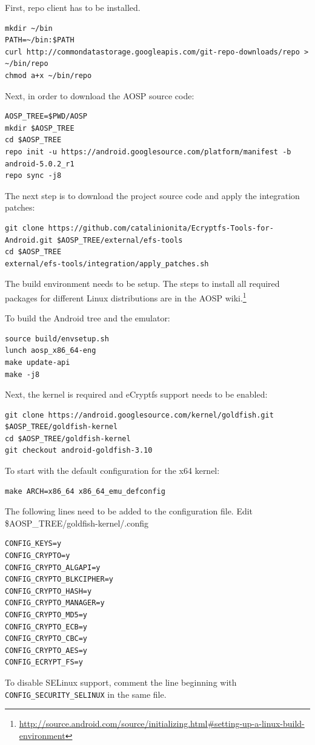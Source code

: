 First, repo client has to be installed.

\begin{lstlisting}[numbers=none]
mkdir ~/bin
PATH=~/bin:$PATH
curl http://commondatastorage.googleapis.com/git-repo-downloads/repo > ~/bin/repo
chmod a+x ~/bin/repo
\end{lstlisting}

Next, in order to download the AOSP source code:
\begin{lstlisting}[numbers=none]
AOSP_TREE=$PWD/AOSP
mkdir $AOSP_TREE
cd $AOSP_TREE
repo init -u https://android.googlesource.com/platform/manifest -b android-5.0.2_r1
repo sync -j8
\end{lstlisting}

The next step is to download the project source code and apply the integration patches:
\begin{lstlisting}[numbers=none]
git clone https://github.com/catalinionita/Ecryptfs-Tools-for-Android.git $AOSP_TREE/external/efs-tools
cd $AOSP_TREE
external/efs-tools/integration/apply_patches.sh
\end{lstlisting}

The build environment needs to be setup. The steps to install all required packages for different Linux distributions are in the AOSP wiki.\footnote{\url{http://source.android.com/source/initializing.html\#setting-up-a-linux-build-environment}}

To build the Android tree and the emulator:
\begin{lstlisting}[numbers=none]
source build/envsetup.sh
lunch aosp_x86_64-eng
make update-api
make -j8
\end{lstlisting}

Next, the kernel is required and eCryptfs support needs to be enabled:
\begin{lstlisting}[numbers=none]
git clone https://android.googlesource.com/kernel/goldfish.git $AOSP_TREE/goldfish-kernel
cd $AOSP_TREE/goldfish-kernel
git checkout android-goldfish-3.10
\end{lstlisting}

To start with the default configuration for the x64 kernel:
\begin{lstlisting}[numbers=none]
make ARCH=x86_64 x86_64_emu_defconfig
\end{lstlisting}

The following lines need to be added to the configuration file. Edit \$AOSP_TREE/goldfish-kernel/.config
\begin{lstlisting}[numbers=none]
CONFIG_KEYS=y
CONFIG_CRYPTO=y
CONFIG_CRYPTO_ALGAPI=y
CONFIG_CRYPTO_BLKCIPHER=y
CONFIG_CRYPTO_HASH=y
CONFIG_CRYPTO_MANAGER=y
CONFIG_CRYPTO_MD5=y
CONFIG_CRYPTO_ECB=y
CONFIG_CRYPTO_CBC=y
CONFIG_CRYPTO_AES=y
CONFIG_ECRYPT_FS=y
\end{lstlisting}
To disable SELinux support, comment the line beginning with \texttt{CONFIG_SECURITY_SELINUX} in the same file.

